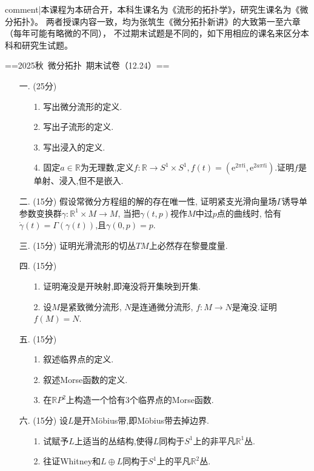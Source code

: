 
{{comment|本课程为本研合开，本科生课名为《流形的拓扑学》，研究生课名为《微分拓扑》。
两者授课内容一致，均为张筑生《微分拓扑新讲》的大致第一至六章（每年可能有略微的不同），
不过期末试题是不同的，如下用相应的课名来区分本科和研究生试题。}}

==2025秋\ 微分拓扑\ 期末试卷（12.24）==

\begin{enumerate}
    \item[一.] (25分)
    \begin{itemize}
        \item[1.] 写出微分流形的定义.
        \item[2.] 写出子流形的定义.
        \item[3.] 写出浸入的定义.
        \item[4.] 固定$a\in\mathbb{R}$为无理数,定义$f:\mathbb{R}\to S^1\times S^1,f(t)=(\mathrm{e}^{2\pi t\mathrm{i}},\mathrm{e}^{2a\pi t\mathrm{i}})$.证明$f$是单射、浸入,但不是嵌入.
    \end{itemize}
    \item[二.] (15分) 假设常微分方程组的解的存在唯一性,
    证明紧支光滑向量场$\Gamma$诱导单参数变换群$\gamma:\mathbb{R}^1\times M \to M$, 
    当把$\gamma(t,p)$视作$M$中过$p$点的曲线时,
    恰有$\dot{\gamma}(t)=\Gamma(\gamma(t))$,且$\gamma(0,p)=p$.
    \item[三.] (15分) 证明光滑流形的切丛$TM$上必然存在黎曼度量.
    \item[四.] (15分)
    \begin{itemize}
        \item[1.]证明淹没是开映射,即淹没将开集映到开集.
        \item[2.]设$M$是紧致微分流形, $N$是连通微分流形, $f:M\to N$是淹没.证明$f(M)=N$.
    \end{itemize}
    \item[五.] (15分)
    \begin{itemize}
        \item[1.]叙述临界点的定义.
        \item[2.]叙述Morse函数的定义.
        \item[3.]在$\mathbb{R}P^2$上构造一个恰有3个临界点的Morse函数.
    \end{itemize}
    \item[六.] (15分) 设$L$是开Möbius带,即Möbius带去掉边界.
    \begin{itemize}
        \item[1.]试赋予$L$上适当的丛结构,使得$L$同构于$S^1$上的非平凡$\mathbb{R}^1$丛.
        \item[2.]往证Whitney和$L\oplus L$同构于$S^1$上的平凡$\mathbb{R}^2$丛.
    \end{itemize}
\end{enumerate}


